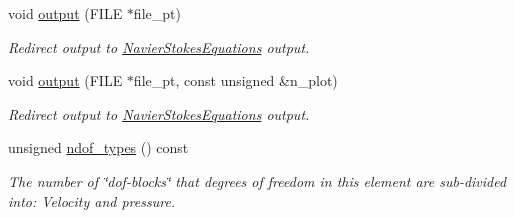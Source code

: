 \begin{DoxyCompactItemize}
void \hyperlink{classoomph_1_1LinearisedQCrouzeixRaviartElement_a3654e347b8eeb08452d67fe19d351cc8}{output} (F\+I\+LE $\ast$file\+\_\+pt)
\begin{DoxyCompactList}\small\item\em Redirect output to \hyperlink{classoomph_1_1NavierStokesEquations}{Navier\+Stokes\+Equations} output. \end{DoxyCompactList}\item 
void \hyperlink{classoomph_1_1LinearisedQCrouzeixRaviartElement_a7418df580bdf0c2fd4dccc263997222e}{output} (F\+I\+LE $\ast$file\+\_\+pt, const unsigned \&n\+\_\+plot)
\begin{DoxyCompactList}\small\item\em Redirect output to \hyperlink{classoomph_1_1NavierStokesEquations}{Navier\+Stokes\+Equations} output. \end{DoxyCompactList}\item 
unsigned \hyperlink{classoomph_1_1LinearisedQCrouzeixRaviartElement_afae2721645a04e31cbd1eace58a1592d}{ndof\+\_\+types} () const
\begin{DoxyCompactList}\small\item\em The number of \char`\"{}dof-\/blocks\char`\"{} that degrees of freedom in this element are sub-\/divided into\+: Velocity and pressure. \end{DoxyCompactList}\end{DoxyCompactItemize}
